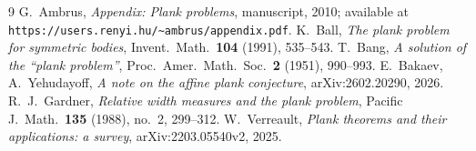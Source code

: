\documentclass[11pt,reqno]{amsart}
\theoremstyle{plain}
\theoremstyle{definition}
\theoremstyle{remark}
\begin{document}
\begin{thebibliography}{9}
 G.\ Ambrus, \emph{Appendix: Plank problems}, manuscript,
2010; available at \texttt{https://users.renyi.hu/\~{}ambrus/appendix.pdf}.
 K.\ Ball, \emph{The plank problem for symmetric bodies},
Invent.\ Math.\ \textbf{104} (1991), 535--543.
 T.\ Bang, \emph{A solution of the ``plank problem''},
Proc.\ Amer.\ Math.\ Soc.\ \textbf{2} (1951), 990--993.
 E.\ Bakaev, A.\ Yehudayoff, \emph{A note on the affine plank
conjecture}, arXiv:2602.20290, 2026.
 R.\ J.\ Gardner, \emph{Relative width measures and the plank
problem}, Pacific J.\ Math.\ \textbf{135} (1988), no.\ 2, 299--312.
 W.\ Verreault, \emph{Plank theorems and their applications: a
survey}, arXiv:2203.05540v2, 2025.
\end{thebibliography}
\end{document}
